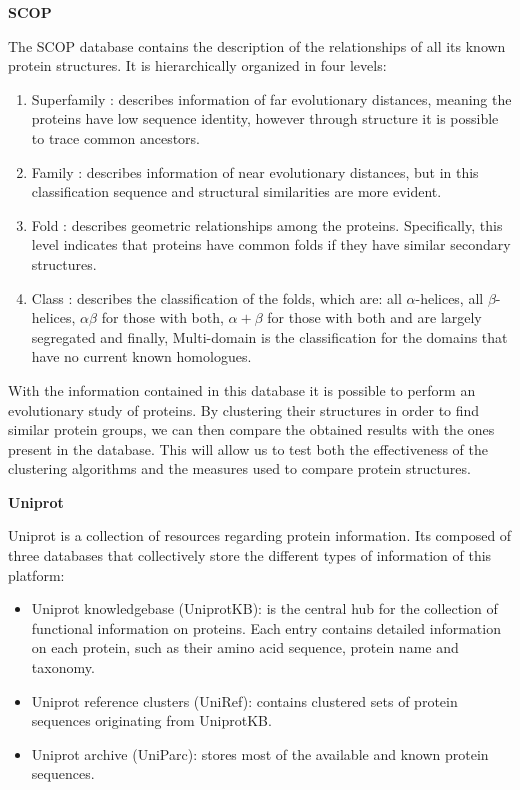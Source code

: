 \medskip
\textbf{SCOP}

The \gls{SCOP} \cite{murzin1995scop} database contains the description of the relationships of all its known protein structures. It is hierarchically organized in four levels:
\begin{enumerate}
	\item Superfamily : describes information of far evolutionary distances, meaning the proteins have low sequence identity, however through structure it is possible to trace common ancestors.
	\item Family : describes information of near evolutionary distances, but in this classification sequence and structural similarities are more evident.
	\item Fold : describes geometric relationships among the proteins. Specifically, this level indicates that proteins have common folds if they have similar secondary structures.
	\item Class : describes the classification of the folds, which are: all $\alpha$-helices, all $\beta$-helices, $\alpha \beta$ for those with both, $\alpha + \beta$ for those with both and are largely segregated and finally, Multi-domain is the classification for the domains that have no current known homologues.  
\end{enumerate}

With the information contained in this database it is possible to perform an evolutionary study of proteins. By clustering their structures in order to find similar protein groups, we can then compare the obtained results with the ones present in the database. This will allow us to test both the effectiveness of the clustering algorithms and the measures used to compare protein structures.
 
\medskip
\textbf{Uniprot}

Uniprot \cite{uniprot2014uniprot} is a collection of resources regarding protein information. Its composed of three databases that collectively store the different types of information of this platform:

\begin{itemize}
	\item Uniprot knowledgebase (UniprotKB): is the central hub for the collection of functional information on proteins. Each entry contains detailed information on each protein, such as their amino acid sequence, protein name and taxonomy.
	\item Uniprot reference clusters (UniRef): contains clustered sets of protein sequences originating from UniprotKB.
	\item Uniprot archive (UniParc): stores most of the available and known protein sequences.
\end{itemize}
 
